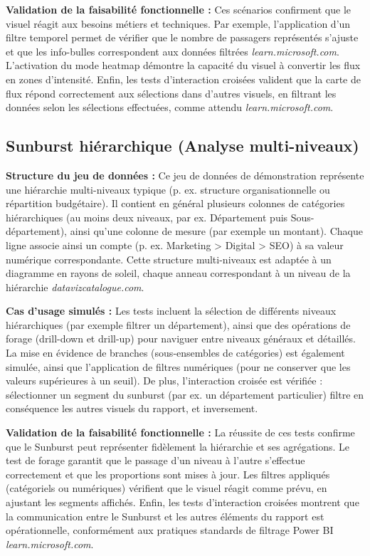 \textbf{Validation de la faisabilité fonctionnelle :} Ces scénarios confirment que le visuel réagit aux besoins métiers et techniques. Par exemple, l’application d’un filtre temporel permet de vérifier que le nombre de passagers représentés s’ajuste et que les info-bulles correspondent aux données filtrées \textit{learn.microsoft.com}. L’activation du mode heatmap démontre la capacité du visuel à convertir les flux en zones d’intensité. Enfin, les tests d’interaction croisées valident que la carte de flux répond correctement aux sélections dans d’autres visuels, en filtrant les données selon les sélections effectuées, comme attendu \textit{learn.microsoft.com}.

\subsection{Sunburst hiérarchique (Analyse multi-niveaux)}
\label{subsec:test-sunburst}

\textbf{Structure du jeu de données :} Ce jeu de données de démonstration représente une hiérarchie multi-niveaux typique (p. ex. structure organisationnelle ou répartition budgétaire). Il contient en général plusieurs colonnes de catégories hiérarchiques (au moins deux niveaux, par ex. Département puis Sous-département), ainsi qu’une colonne de mesure (par exemple un montant). Chaque ligne associe ainsi un compte (p. ex. Marketing > Digital > SEO) à sa valeur numérique correspondante. Cette structure multi-niveaux est adaptée à un diagramme en rayons de soleil, chaque anneau correspondant à un niveau de la hiérarchie \textit{datavizcatalogue.com}.

\textbf{Cas d’usage simulés :} Les tests incluent la sélection de différents niveaux hiérarchiques (par exemple filtrer un département), ainsi que des opérations de forage (drill-down et drill-up) pour naviguer entre niveaux généraux et détaillés. La mise en évidence de branches (sous-ensembles de catégories) est également simulée, ainsi que l’application de filtres numériques (pour ne conserver que les valeurs supérieures à un seuil). De plus, l’interaction croisée est vérifiée : sélectionner un segment du sunburst (par ex. un département particulier) filtre en conséquence les autres visuels du rapport, et inversement.

\textbf{Validation de la faisabilité fonctionnelle :} La réussite de ces tests confirme que le Sunburst peut représenter fidèlement la hiérarchie et ses agrégations. Le test de forage garantit que le passage d’un niveau à l’autre s’effectue correctement et que les proportions sont mises à jour. Les filtres appliqués (catégoriels ou numériques) vérifient que le visuel réagit comme prévu, en ajustant les segments affichés. Enfin, les tests d’interaction croisées montrent que la communication entre le Sunburst et les autres éléments du rapport est opérationnelle, conformément aux pratiques standards de filtrage Power BI \textit{learn.microsoft.com}.
